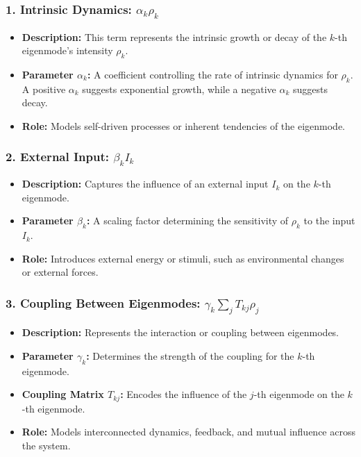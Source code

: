 \documentclass{article}
\theoremstyle{plain}
\begin{document}
\subsubsection{1. Intrinsic Dynamics: \(\alpha_k \rho_k\)}
\begin{itemize}
    \item \textbf{Description:} This term represents the intrinsic growth or decay of the \(k\)-th eigenmode’s intensity \(\rho_k\).
    \item \textbf{Parameter \(\alpha_k\):} A coefficient controlling the rate of intrinsic dynamics for \(\rho_k\). A positive \(\alpha_k\) suggests exponential growth, while a negative \(\alpha_k\) suggests decay.
    \item \textbf{Role:} Models self-driven processes or inherent tendencies of the eigenmode.
\end{itemize}

\subsubsection{2. External Input: \(\beta_k I_k\)}
\begin{itemize}
    \item \textbf{Description:} Captures the influence of an external input \(I_k\) on the \(k\)-th eigenmode.
    \item \textbf{Parameter \(\beta_k\):} A scaling factor determining the sensitivity of \(\rho_k\) to the input \(I_k\).
    \item \textbf{Role:} Introduces external energy or stimuli, such as environmental changes or external forces.
\end{itemize}

\subsubsection{3. Coupling Between Eigenmodes: \(\gamma_k \sum_j T_{kj} \rho_j\)}
\begin{itemize}
    \item \textbf{Description:} Represents the interaction or coupling between eigenmodes.
    \item \textbf{Parameter \(\gamma_k\):} Determines the strength of the coupling for the \(k\)-th eigenmode.
    \item \textbf{Coupling Matrix \(T_{kj}\):} Encodes the influence of the \(j\)-th eigenmode on the \(k\)-th eigenmode.
    \item \textbf{Role:} Models interconnected dynamics, feedback, and mutual influence across the system.
\end{itemize}
\end{document}
